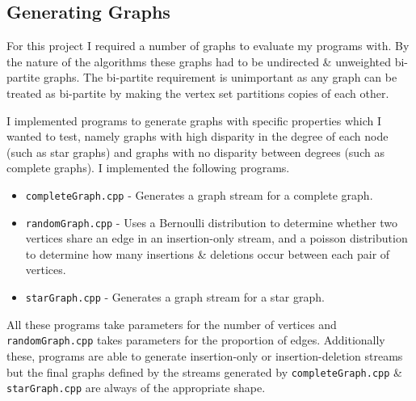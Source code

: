 \documentclass[11pt,twoside,a4paper]{report}
\begin{document}
\subsection{Generating Graphs}

For this project I required a number of graphs to evaluate my programs with. By the nature of the algorithms these graphs had to be undirected \& unweighted bi-partite graphs. The bi-partite requirement is unimportant as any graph can be treated as bi-partite by making the vertex set partitions copies of each other.
\par I implemented programs to generate graphs with specific properties which I wanted to test, namely graphs with high disparity in the degree of each node (such as star graphs) and graphs with no disparity between degrees (such as complete graphs). %
I implemented the following programs.
\begin{itemize}
	\item \texttt{completeGraph.cpp} - Generates a graph stream for a complete graph.
	\item \texttt{randomGraph.cpp} - Uses a Bernoulli distribution to determine whether two vertices share an edge in an insertion-only stream, and a poisson distribution to determine how many insertions \& deletions occur between each pair of vertices.
	\item \texttt{starGraph.cpp} - Generates a graph stream for a star graph.
\end{itemize}
All these programs take parameters for the number of vertices and \texttt{randomGraph.cpp} takes parameters for the proportion of edges. Additionally these, programs are able to generate insertion-only or insertion-deletion streams but the final graphs defined by the streams generated by \texttt{completeGraph.cpp} \& \texttt{starGraph.cpp} are always of the appropriate shape. %
\end{document}
